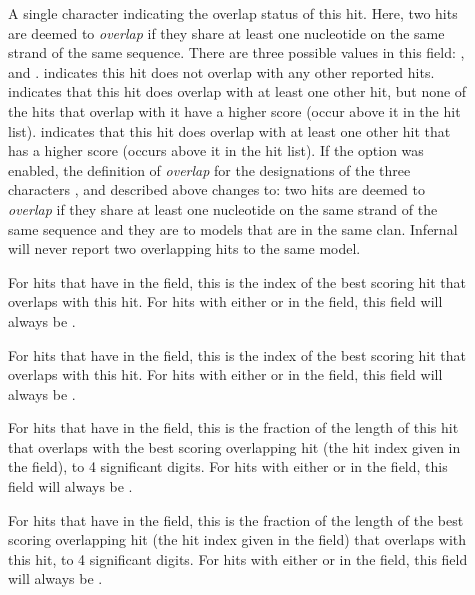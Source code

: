 \begin{description}

\item[]

A single character indicating the overlap status of this hit. Here,
two hits are deemed to \emph{overlap} if they share at least one
nucleotide on the same strand of the same sequence. There are 
three possible values in this field: \ccode{*}, \ccode{^} and \ccode{=}. 
\ccode{*} indicates this hit does not
overlap with any other reported hits. \ccode{^} indicates that this
hit does overlap with at least one other hit, but none of the
hits that overlap with it have a higher score (occur above it in the
hit list). \ccode{=} indicates that this hit does overlap with at
least one other hit that has a higher score (occurs above it in the
hit list). If the  option was enabled, the definition
of \emph{overlap} for the designations of the three characters
\ccode{*}, \ccode{^} and \ccode{=} described above changes to: two
hits are deemed to \emph{overlap} if they share at least one
nucleotide on the same strand of the same sequence and they are to
models that are in the same clan. Infernal will never report two
overlapping hits to the same model.

\item[]
For hits that have \ccode{=} in the  field, this is the
index of the best scoring hit that overlaps with this hit.
For hits with either \ccode{*} or \ccode{^} in the  field,
this field will always be \ccode{-}.

\item[]
For hits that have \ccode{=} in the  field, this is the
index of the best scoring hit that overlaps with this hit.
For hits with either \ccode{*} or \ccode{^} in the  field,
this field will always be \ccode{-}.

\item[]
For hits that have \ccode{=} in the  field, this is the
fraction of the length of this hit that overlaps with the best scoring
overlapping hit (the hit index given in the  field), to
4 significant digits. 
For hits with either \ccode{*} or \ccode{^} in the  field,
this field will always be \ccode{-}.

\item[]
For hits that have \ccode{=} in the  field, this is the
fraction of the length of the best scoring overlapping hit (the hit
index given in the  field) that overlaps with this hit,
to 4 significant digits. 
For hits with either \ccode{*} or \ccode{^} in the  field,
this field will always be \ccode{-}.


\end{description}
